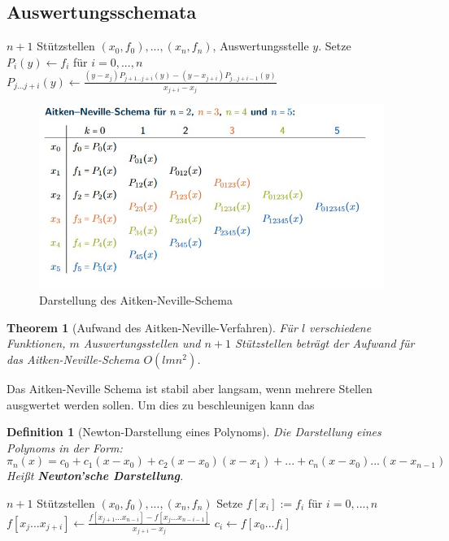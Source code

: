 \documentclass[10pt,a4paper]{article}
\newtheorem{theorem}{Theorem}
\newtheorem{definition}{Definition}
\begin{document}
	\subsection{Auswertungsschemata}
	\begin{algorithm}[H]
		\caption{Auswertungschema von Aitken-Neville}
		\begin{algorithmic}
			\Require $n+1$ Stützstellen $(x_0, f_0), ..., (x_n, f_n)$, Auswertungsstelle $y$.
			\State Setze $P_i(y) \leftarrow f_i$ für $i=0, ..., n$
			\State $P_{j...j+i}(y) \leftarrow \frac{(y-x_j)P_{j+1...j+i}(y)-(y-x_{j+i})P_{j...j+i-1}(y)}{x_{j+i}- x_{j}}$
			\EndFor
			\EndFor
		\end{algorithmic}
	\end{algorithm}
	\begin{figure}[H]
		\centering
		\caption{Darstellung des Aitken-Neville-Schema}
		\includegraphics[scale=0.5]{aitken-neville.jpg}
	\end{figure}
	\begin{theorem}[Aufwand des Aitken-Neville-Verfahren]
		Für $l$ verschiedene Funktionen, $m$ Auswertungsstellen und $n+1$ Stützstellen beträgt der Aufwand für das Aitken-Neville-Schema $O(lmn^2)$.
	\end{theorem}
	Das Aitken-Neville Schema ist stabil aber langsam, wenn mehrere Stellen ausgwertet werden sollen. Um dies zu beschleunigen kann das 
	\begin{definition}[Newton-Darstellung eines Polynoms]
		Die Darstellung eines Polynoms in der Form:
		$$\pi_n(x) = c_0 + c_1(x-x_0) + c_2(x-x_0)(x-x_1) + ... + c_n(x-x_0)...(x-x_{n-1})$$
		Heißt \textbf{Newton'sche Darstellung}.
	\end{definition}
	\begin{algorithm}[H]
		\caption{Newton'sche Dividierte Differenzen}
		\begin{algorithmic}
			\Require $n+1$ Stützstellen $(x_0, f_0), ..., (x_n, f_n)$
			\State Setze $f[x_i]:=f_i$ für $i=0, ..., n$
			\For{$i=1, ..., n$}
			\For{$j=0, ..., n-i$}
			\State $f[x_j...x_{j+i}] \leftarrow \frac{f[x_{j+1}...x_{n-i}]-f[x_{j}...x_{n-i-1}]}{x_{j+i}- x_{j}}$
			\EndFor
			\EndFor
			\State $c_i \leftarrow f[x_0...f_i]$
		\end{algorithmic}
	\end{algorithm}
\end{document}
